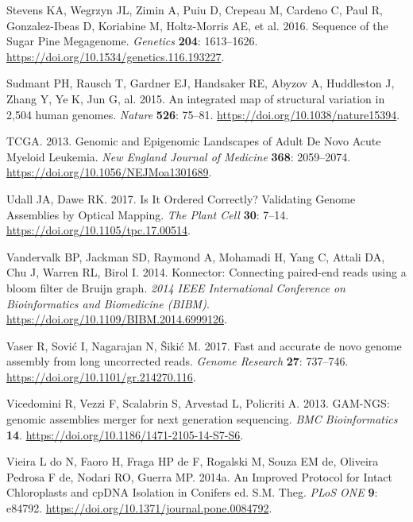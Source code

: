 \documentclass[
  12pt,
  oneside,
  openany]{book}
\begin{document}
\leavevmode\hypertarget{ref-Stevens_2016}{}%
Stevens KA, Wegrzyn JL, Zimin A, Puiu D, Crepeau M, Cardeno C, Paul R, Gonzalez-Ibeas D, Koriabine M, Holtz-Morris AE, et al. 2016. Sequence of the Sugar Pine Megagenome. \emph{Genetics} \textbf{204}: 1613--1626. \url{https://doi.org/10.1534/genetics.116.193227}.

\leavevmode\hypertarget{ref-Sudmant_2015}{}%
Sudmant PH, Rausch T, Gardner EJ, Handsaker RE, Abyzov A, Huddleston J, Zhang Y, Ye K, Jun G, al. 2015. An integrated map of structural variation in 2,504 human genomes. \emph{Nature} \textbf{526}: 75--81. \url{https://doi.org/10.1038/nature15394}.

\leavevmode\hypertarget{ref-TCGA_2013}{}%
TCGA. 2013. Genomic and Epigenomic Landscapes of Adult De Novo Acute Myeloid Leukemia. \emph{New England Journal of Medicine} \textbf{368}: 2059--2074. \url{https://doi.org/10.1056/NEJMoa1301689}.

\leavevmode\hypertarget{ref-Udall_2017}{}%
Udall JA, Dawe RK. 2017. Is It Ordered Correctly? Validating Genome Assemblies by Optical Mapping. \emph{The Plant Cell} \textbf{30}: 7--14. \url{https://doi.org/10.1105/tpc.17.00514}.

\leavevmode\hypertarget{ref-Vandervalk_2014}{}%
Vandervalk BP, Jackman SD, Raymond A, Mohamadi H, Yang C, Attali DA, Chu J, Warren RL, Birol I. 2014. Konnector: Connecting paired-end reads using a bloom filter de Bruijn graph. \emph{2014 IEEE International Conference on Bioinformatics and Biomedicine (BIBM)}. \url{https://doi.org/10.1109/BIBM.2014.6999126}.

\leavevmode\hypertarget{ref-Vaser_2017}{}%
Vaser R, Sović I, Nagarajan N, Šikić M. 2017. Fast and accurate de novo genome assembly from long uncorrected reads. \emph{Genome Research} \textbf{27}: 737--746. \url{https://doi.org/10.1101/gr.214270.116}.

\leavevmode\hypertarget{ref-Vicedomini_2013}{}%
Vicedomini R, Vezzi F, Scalabrin S, Arvestad L, Policriti A. 2013. GAM-NGS: genomic assemblies merger for next generation sequencing. \emph{BMC Bioinformatics} \textbf{14}. \url{https://doi.org/10.1186/1471-2105-14-S7-S6}.

\leavevmode\hypertarget{ref-Vieira_2014_Improved}{}%
Vieira L do N, Faoro H, Fraga HP de F, Rogalski M, Souza EM de, Oliveira Pedrosa F de, Nodari RO, Guerra MP. 2014a. An Improved Protocol for Intact Chloroplasts and cpDNA Isolation in Conifers ed. S.M. Theg. \emph{PLoS ONE} \textbf{9}: e84792. \url{https://doi.org/10.1371/journal.pone.0084792}.
\end{document}
